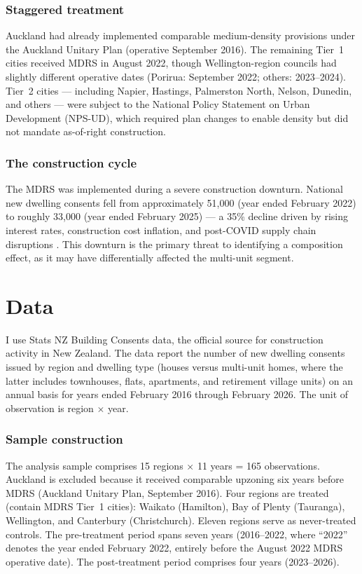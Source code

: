 \documentclass[12pt]{article}
\begin{document}
\subsubsection*{Staggered treatment} Auckland had already implemented comparable medium-density provisions under the Auckland Unitary Plan (operative September 2016). The remaining Tier~1 cities received MDRS in August 2022, though Wellington-region councils had slightly different operative dates (Porirua: September 2022; others: 2023--2024). Tier~2 cities --- including Napier, Hastings, Palmerston North, Nelson, Dunedin, and others --- were subject to the National Policy Statement on Urban Development (NPS-UD), which required plan changes to enable density but did not mandate as-of-right construction.

\subsubsection*{The construction cycle} The MDRS was implemented during a severe construction downturn. National new dwelling consents fell from approximately 51,000 (year ended February 2022) to roughly 33,000 (year ended February 2025) --- a 35\% decline driven by rising interest rates, construction cost inflation, and post-COVID supply chain disruptions \citep{rbnz2023fsr}. This downturn is the primary threat to identifying a composition effect, as it may have differentially affected the multi-unit segment.


\section{Data}
\label{sec:data}

I use Stats NZ Building Consents data, the official source for construction activity in New Zealand. The data report the number of new dwelling consents issued by region and dwelling type (houses versus multi-unit homes, where the latter includes townhouses, flats, apartments, and retirement village units) on an annual basis for years ended February 2016 through February 2026. The unit of observation is region $\times$ year.

\subsubsection*{Sample construction} The analysis sample comprises 15 regions $\times$ 11 years = 165 observations. Auckland is excluded because it received comparable upzoning six years before MDRS (Auckland Unitary Plan, September 2016). Four regions are treated (contain MDRS Tier~1 cities): Waikato (Hamilton), Bay of Plenty (Tauranga), Wellington, and Canterbury (Christchurch). Eleven regions serve as never-treated controls. The pre-treatment period spans seven years (2016--2022, where ``2022'' denotes the year ended February 2022, entirely before the August 2022 MDRS operative date). The post-treatment period comprises four years (2023--2026).
\end{document}
